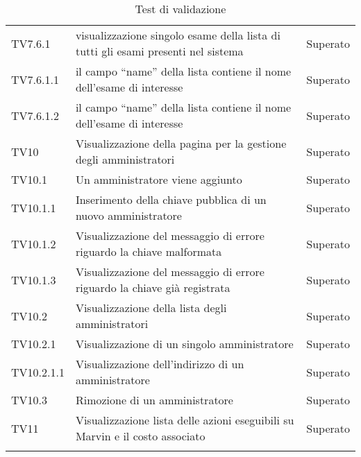\documentclass[PianoDiQualifica.tex]{subfiles}
\begin{document}
\begin{longtable}[H]{P{2cm}P{8.5cm}P{3cm}}
	TV7.6.1 & visualizzazione singolo esame della lista di tutti gli esami presenti nel sistema & Superato \\ 
	TV7.6.1.1 & il campo “name” della lista contiene il nome dell'esame di interesse & Superato \\ 
	TV7.6.1.2 & il campo “name” della lista contiene il nome dell'esame di interesse & Superato \\ 
	TV10 & Visualizzazione  della pagina per la gestione degli amministratori & Superato \\ 
	TV10.1 & Un amministratore viene aggiunto & Superato \\ 
	TV10.1.1 & Inserimento della chiave pubblica di un nuovo amministratore & Superato \\ 
	TV10.1.2 & Visualizzazione del messaggio di errore riguardo la chiave malformata & Superato \\ 
	TV10.1.3 & Visualizzazione del messaggio di errore riguardo la chiave già registrata & Superato \\ 
	TV10.2 & Visualizzazione della lista degli amministratori & Superato \\ 
	TV10.2.1 & Visualizzazione di un singolo amministratore & Superato \\ 
	TV10.2.1.1 & Visualizzazione dell'indirizzo di un amministratore & Superato \\ 
	TV10.3 & Rimozione di un amministratore & Superato \\ 
	TV11 & Visualizzazione lista delle azioni eseguibili su Marvin e il costo associato & Superato \\ 

	\hiderowcolors
	\caption{Test di validazione}
\end{longtable}
\end{document}
